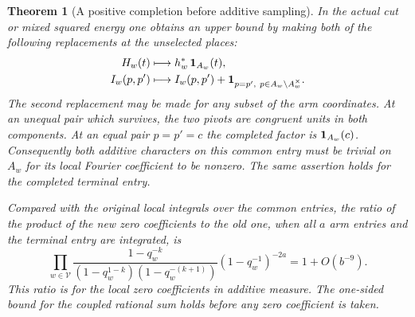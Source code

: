 \documentclass[a4paper,11pt]{article}
\newtheorem{theorem}[proposition]{Theorem}
\theoremstyle{definition}
\theoremstyle{remark}
\numberwithin{equation}{section}
\begin{document}
\begin{theorem}[A positive completion before additive sampling]
\leavevmode\label{thm:commoncompletion889}
In the actual cut or mixed squared energy one obtains an upper
bound by making both of the following replacements at the
unselected places:
\begin{align*}
 H_w(t)&\longmapsto h_w^*\,{\bf1}_{A_w}(t),\\
 I_w(p,p')&\longmapsto
 I_w(p,p')+{\bf1}_{p=p',\ p\in A_w\setminus A_w^\times}.
\end{align*}
The second replacement may be made for any subset of the arm
coordinates. At an unequal pair which survives, the two pivots
are congruent units in both components. At an equal pair
\(p=p'=c\) the completed factor is \({\bf1}_{A_w}(c)\).
Consequently both additive characters on this common entry must
be trivial on \(A_w\) for its local Fourier coefficient to be
nonzero. The same assertion holds for the completed terminal
entry.

Compared with the original local integrals over the common
entries, the ratio of the product of the new zero coefficients
to the old one, when all \(a\) arm entries and the terminal
entry are integrated, is
\begin{equation}
 \prod_{w\in\mathcal V}
 \frac{1-q_w^{-k}}{(1-q_w^{1-k})(1-q_w^{-(k+1)})}
                       (1-q_w^{-1})^{-2a}
                 =1+O(b^{-9}).
 \label{eq:completioncost889}
\end{equation}
This ratio is for the local zero coefficients in additive measure.
The one-sided bound for the coupled rational sum holds before
any zero coefficient is taken.
\end{theorem}
\end{document}
